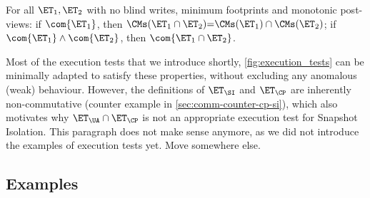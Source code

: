 
\begin{theorem}[Compositionality]     
For all $\ET_1, \ET_2$ with no blind writes, minimum footprints and monotonic post-views: 
if $\com{\ET_1}$, 
then $\CMs(\ET_1 \cap \ET_2) {=} \CMs(\ET_1) \cap \CMs(\ET_2)$;
if $\com{\ET_1} \land \com{\ET_2}$, then $\com{\ET_1 \cap \ET_2}$.
\end{theorem}

Most of the execution tests that we introduce shortly,  \cref{fig:execution_tests} can be minimally adapted to satisfy these 
properties, without excluding any anomalous (weak) behaviour. However, the definitions 
of $\ET_{\SI}$ and $\ET_{\CP}$ are inherently non-commutative (counter example in \cref{sec:comm-counter-cp-si}), which also motivates 
why $\ET_{\UA} \cap \ET_{\CP}$ is not an appropriate execution test for Snapshot Isolation.
\ac{This paragraph does not make sense anymore, as we did not introduce the examples of execution tests yet. Move somewhere else.}


\subsection{Examples}\label{subsec:cm_examples}

